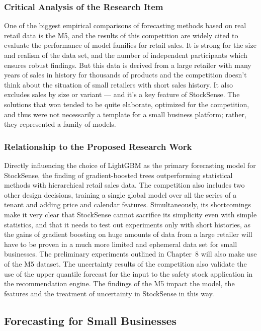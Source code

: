 \documentclass{StockSense}
\begin{document}
\subsubsection{Critical Analysis of the Research Item}

One of the biggest empirical comparisons of forecasting methods based on real retail data is the M5, and the results of this competition are widely cited to evaluate the performance of model families for retail sales. It is strong for the size and realism of the data set, and the number of independent participants which ensures robust findings. But this data is derived from a large retailer with many years of sales in history for thousands of products and the competition doesn't think about the situation of small retailers with short sales history. It also excludes sales by size or variant — and it's a key feature of StockSense. The solutions that won tended to be quite elaborate, optimized for the competition, and thus were not necessarily a template for a small business platform; rather, they represented a family of models.

\subsubsection{Relationship to the Proposed Research Work}

Directly influencing the choice of LightGBM as the primary forecasting model for StockSense, the finding of gradient-boosted trees outperforming statistical methods with hierarchical retail sales data. The competition also includes two other design decisions, training a single global model over all the series of a tenant and adding price and calendar features. Simultaneously, its shortcomings make it very clear that StockSense cannot sacrifice its simplicity even with simple statistics, and that it needs to test out experiments only with short histories, as the gains of gradient boosting on huge amounts of data from a large retailer will have to be proven in a much more limited and ephemeral data set for small businesses. The preliminary experiments outlined in Chapter~8 will also make use of the M5 dataset. The uncertainty results of the competition also validate the use of the upper quantile forecast for the input to the safety stock application in the recommendation engine. The findings of the M5 impact the model, the features and the treatment of uncertainty in StockSense in this way.

\subsection{Forecasting for Small Businesses}
\end{document}
